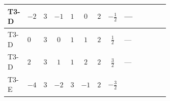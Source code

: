 \documentclass[8pt]{article}
\begin{document}
\begin{landscape}
\begin{longtable}{@{}llcccccc >{\raggedright\arraybackslash}p{0.21\linewidth} >{\raggedright\arraybackslash}p{0.21\linewidth} >{\raggedright\arraybackslash}p{0.21\linewidth}@{}}
\midrule
T3-D & $-2$ & $3$ & $-1$ & $1$ & $0$ & $2$ & $-\frac{1}{2}$ & --- & \scriptsize\adjustbox{max width=\linewidth}{$\begin{gathered} -4 \operatorname{Tr}\!\left({y_2}\,\left({y_2}\right)^{\dagger}\,{Y_e}\,\left({Y_e}\right)^{\dagger}\right)\end{gathered}$} & \scriptsize\adjustbox{max width=\linewidth}{$\begin{gathered} +12 {\lambda_5} \left({\lambda_5}\right)^{*}\end{gathered}$} \\
\midrule
T3-D & $0$ & $3$ & $0$ & $1$ & $1$ & $2$ & $\frac{1}{2}$ & --- & \scriptsize\adjustbox{max width=\linewidth}{$\begin{gathered} -4 \operatorname{Tr}\!\left({y_2}\,\left({y_2}\right)^{\dagger}\,{Y_e}\,\left({Y_e}\right)^{\dagger}\right)\end{gathered}$} & \scriptsize\adjustbox{max width=\linewidth}{$\begin{gathered} +12 {\lambda_5} \left({\lambda_5}\right)^{*}\end{gathered}$} \\
\midrule
T3-D & $2$ & $3$ & $1$ & $1$ & $2$ & $2$ & $\frac{3}{2}$ & --- & \scriptsize\adjustbox{max width=\linewidth}{$\begin{gathered} -4 \operatorname{Tr}\!\left({y_2}\,\left({y_2}\right)^{\dagger}\,{Y_e}\,\left({Y_e}\right)^{\dagger}\right)\end{gathered}$} & \scriptsize\adjustbox{max width=\linewidth}{$\begin{gathered} +12 {\lambda_5} \left({\lambda_5}\right)^{*}\end{gathered}$} \\
\midrule
T3-E & $-4$ & $3$ & $-2$ & $3$ & $-1$ & $2$ & $-\frac{3}{2}$ & \scriptsize\adjustbox{max width=\linewidth}{$\begin{gathered} {\lambda_{HS_2}^{(1)}} (2 T_{\nu}^{(2)}+6 \operatorname{Tr}\!\left({Y_d}\,\left({Y_d}\right)^{\dagger}\right)+2 \operatorname{Tr}\!\left({Y_e}\,\left({Y_e}\right)^{\dagger}\right)+6 \operatorname{Tr}\!\left({Y_u}\,\left({Y_u}\right)^{\dagger}\right)+4 {\lambda_{S_2}^{(A)}})\end{gathered}$} & \scriptsize\adjustbox{max width=\linewidth}{$\begin{gathered} -2 \operatorname{Tr}\!\left({y_2}\,\left({y_2}\right)^{\dagger}\,{Y_e}\,\left({Y_e}\right)^{\dagger}\right)\end{gathered}$} & \scriptsize\adjustbox{max width=\linewidth}{$\begin{gathered} +4 {\lambda_5} \left({\lambda_5}\right)^{*}\end{gathered}$} \\

\end{longtable}
\end{landscape}
\end{document}
